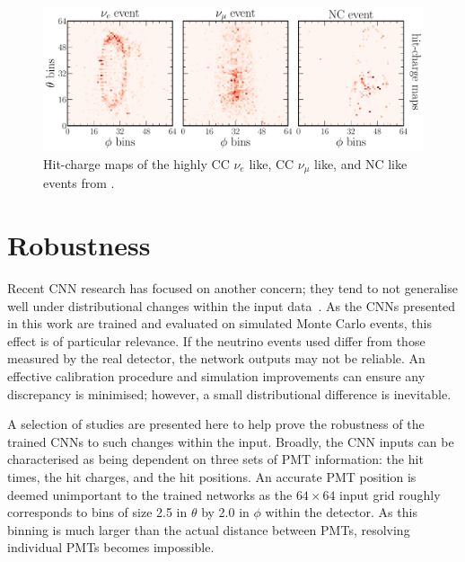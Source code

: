 \begin{figure} %
    \includegraphics[width=\textwidth]{diagrams/7-results/explain_beam_tsne_events.pdf}
    \caption[Hit-charge maps of highly CC $\nu_{e}$ like, CC $\nu_{\mu}$ like, and NC like events]
    {Hit-charge maps of the highly CC $\nu_{e}$ like, CC $\nu_{\mu}$ like, and NC like events from
        .}
    \label{fig:explain_beam_tsne_events}
\end{figure}

\section{Robustness} %
\label{sec:results_robust} %

Recent CNN research has focused on another concern; they tend to not generalise well under
distributional changes within the input data~\cite{djolonga2020}. As the CNNs presented in this
work are trained and evaluated on simulated Monte Carlo events, this effect is of particular
relevance. If the neutrino events used differ from those measured by the real \chipsfive detector,
the network outputs may not be reliable. An effective calibration procedure and simulation
improvements can ensure any discrepancy is minimised; however, a small distributional difference
is inevitable.

A selection of studies are presented here to help prove the robustness of the trained CNNs to such
changes within the input. Broadly, the CNN inputs can be characterised as being dependent on three
sets of PMT information: the hit times, the hit charges, and the hit positions. An accurate PMT
position is deemed unimportant to the trained networks as the $64 \times 64$ input grid roughly
corresponds to bins of size \SI{2.5}{} in $\theta$ by \SI{2.0}{} in $\phi$ within
the \chipsfive detector. As this binning is much larger than the actual distance between PMTs,
resolving individual PMTs becomes impossible.

